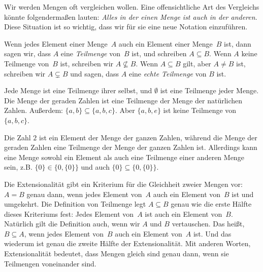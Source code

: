 \documentclass[../../../include/open-logic-section]{subfiles}
\begin{document}

\begin{explain}
Wir werden Mengen oft vergleichen wollen. Eine offensichtliche Art des Vergleichs
könnte folgendermaßen lauten: \emph{Alles in der einen Menge ist auch in der anderen}.
Diese Situation ist so wichtig, dass wir für sie
eine neue Notation einzuführen.
\end{explain}

\begin{defn}[Teilmenge]
Wenn jedes Element einer Menge~$A$ auch ein Element einer Menge~$B$ ist, dann sagen wir,
dass $A$ eine \emph{Teilmenge} von~$B$ ist, und schreiben $A \subseteq B$. Wenn
$A$ keine Teilmenge von~$B$ ist, schreiben wir $A \not\subseteq B$.
Wenn $A \subseteq B$ gilt, aber $A \neq B$ ist, schreiben wir $A \subsetneq B$ und sagen,
dass $A$ eine \emph{echte Teilmenge} von $B$ ist.
\end{defn}

\begin{ex}
Jede Menge ist eine Teilmenge ihrer selbst, und $\emptyset$ ist eine Teilmenge jeder
Menge. Die Menge der geraden Zahlen ist eine Teilmenge der Menge der natürlichen
Zahlen. Außerdem: $\{ a, b \} \subseteq \{ a, b, c \}$. Aber $\{ a, b, e
\}$ ist keine Teilmenge von $\{ a, b, c \}$.
\end{ex}

\begin{ex}
Die Zahl $2$ ist ein Element der Menge der ganzen Zahlen, während die
Menge der geraden Zahlen eine Teilmenge der Menge der ganzen Zahlen ist. Allerdings kann eine 
Menge sowohl ein Element als auch eine Teilmenge einer anderen Menge sein, z.B. $\{0\} \in \{0, \{0\}\}$ und auch $\{0\} \subseteq \{0,
\{0\}\}$.
\end{ex}

Die Extensionalität gibt ein Kriterium für die Gleichheit zweier Mengen 
vor: $A = B$ genau dann, wenn
jedes Element von~$A$ auch ein Element von~$B$ ist und umgekehrt.
Die Definition von \glqq Teilmenge\grqq{} legt $A \subseteq B$ genau wie die
erste Hälfte dieses Kriteriums fest: Jedes Element von~$A$ ist auch
ein Element von~$B$. Natürlich gilt die Definition auch, wenn wir
$A$ und $B$ vertauschen. Das heißt, $B \subseteq A$, wenn jedes Element
von~$B$ auch ein Element von~$A$ ist. Und das wiederum ist genau die zweite Hälfte
der Extensionalität. Mit anderen Worten, Extensionalität
bedeutet, dass Mengen gleich sind genau dann, wenn sie Teilmengen voneinander sind.
\end{document}
